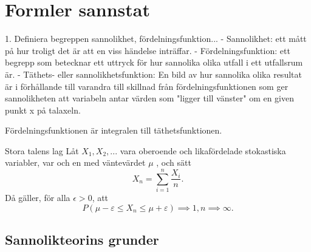 \documentclass{article}
\begin{document}
\section*{Formler sannstat}

1. Definiera begreppen sannolikhet, fördelningsfunktion...
- Sannolikhet: ett mått på hur troligt det är att en viss händelse inträffar.
- Fördelningsfunktion: ett begrepp som betecknar ett uttryck för hur sannolika
olika utfall i ett utfallsrum är.
- Täthets- eller sannolikhetsfunktion: En bild av hur sannolika olika resultat
är i förhållande till varandra till skillnad från fördelningsfunktionen som ger
sannolikheten att variabeln antar värden som "ligger till vänster" om en given
punkt x på talaxeln.

Fördelningsfunktionen är integralen till täthetsfunktionen.

Stora talens lag
Låt $X_1, X_2, ...$ vara oberoende och likafördelade stokastiska variabler, var
och en med väntevärdet $\mu$ , och sätt
$$
X_n = \sum\limits_{i=1}^{n}\frac{X_i}{n}.
$$
Då gäller, för alla $\epsilon > 0$, att
$$
P(\mu - \varepsilon \le X_n \le \mu + \varepsilon) \implies 1, n \implies \infty.
$$

\subsection{Sannolikteorins grunder}
\end{document}
